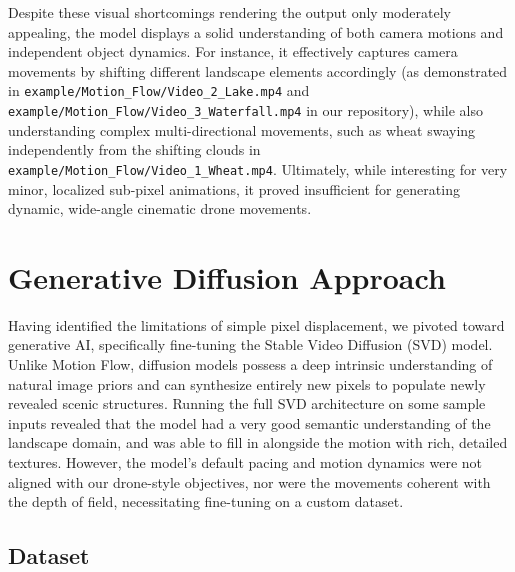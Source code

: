 \documentclass[10pt,twocolumn,letterpaper]{article}
\begin{document}
Despite these visual shortcomings rendering the output only moderately appealing, the model displays a solid understanding of both camera motions and independent object dynamics. For instance, it effectively captures camera movements by shifting different landscape elements accordingly (as demonstrated in \texttt{example/Motion\_Flow/Video\_2\_Lake.mp4} and \texttt{example/Motion\_Flow/Video\_3\_Waterfall.mp4} in our repository), while also understanding complex multi-directional movements, such as wheat swaying independently from the shifting clouds in \texttt{example/Motion\_Flow/Video\_1\_Wheat.mp4}. Ultimately, while interesting for very minor, localized sub-pixel animations, it proved insufficient for generating dynamic, wide-angle cinematic drone movements.

\section{Generative Diffusion Approach}

Having identified the limitations of simple pixel displacement, we pivoted toward generative AI, specifically fine-tuning the Stable Video Diffusion (SVD) model. 
Unlike Motion Flow, diffusion models possess a deep intrinsic understanding of natural image priors and can synthesize entirely new pixels to populate newly revealed scenic structures.
Running the full SVD architecture on some sample inputs revealed that the model had a very good semantic understanding of the landscape domain, and was able to fill in alongside the motion with rich, detailed textures. 
However, the model's default pacing and motion dynamics were not aligned with our drone-style objectives, nor were the movements coherent with the depth of field, necessitating fine-tuning on a custom dataset.

\subsection{Dataset}
\end{document}
